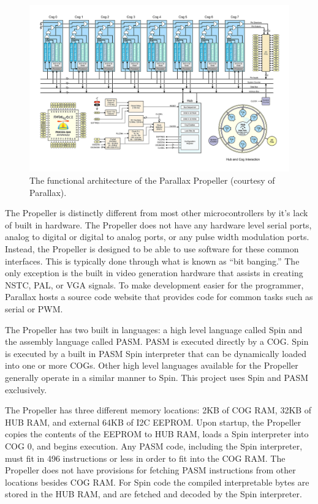 \documentclass{article}
\numberwithin{equation}{section} %
\begin{document}
\begin{figure}[h!]
  \centering
	\includegraphics[scale=.17]{PropellerArchitecture.jpg}
  \caption{The functional architecture of the Parallax Propeller (courtesy of Parallax).}
\end{figure}  

The Propeller is distinctly different from most other microcontrollers by it's lack of built in hardware. The Propeller does not have any hardware level serial ports, analog to digital or digital to analog ports, or any pulse width modulation ports. Instead, the Propeller is designed to be able to use software for these common interfaces. This is typically done through what is known as “bit banging.” The only exception is the built in video generation hardware that assists in creating NSTC, PAL, or VGA signals. To make development easier for the programmer, Parallax hosts a source code website that provides code for common tasks such as serial or PWM.

The Propeller has two built in languages: a high level language called Spin and the assembly language called PASM. PASM is executed directly by a COG. Spin is executed by a built in PASM Spin interpreter that can be dynamically loaded into one or more COGs. Other high level languages available for the Propeller generally operate in a similar manner to Spin. This project uses Spin and PASM exclusively.

The Propeller has three different memory locations: 2KB of COG RAM, 32KB of HUB RAM, and external 64KB of I2C EEPROM. Upon startup, the Propeller copies the contents of the EEPROM to HUB RAM, loads a Spin interpreter into COG 0, and begins execution.  Any PASM code, including the Spin interpreter, must fit in 496 instructions or less in order to fit into the COG RAM. The Propeller does not have provisions for fetching PASM instructions from other locations besides COG RAM. For Spin code the compiled interpretable bytes are stored in the HUB RAM, and are fetched and decoded by the Spin interpreter.
\end{document}
